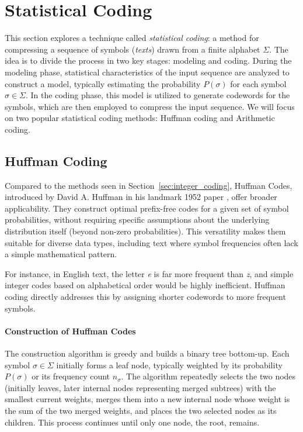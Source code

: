\clearpage
\section{Statistical Coding} \label{sec:statistical_coding}

This section explores a technique called \emph{statistical coding}: a method for compressing a sequence of symbols (\emph{texts}) drawn from a finite alphabet $\Sigma$. The idea is to divide the process in two key stages: modeling and coding. During the modeling phase, statistical characteristics of the input sequence are analyzed to construct a model, typically estimating the probability $P(\sigma)$ for each symbol $\sigma \in \Sigma$. In the coding phase, this model is utilized to generate codewords for the symbols, which are then employed to compress the input sequence. We will focus on two popular statistical coding methods: Huffman coding and Arithmetic coding.

\subsection{Huffman Coding} \label{subsec:huffman_coding}

Compared to the methods seen in Section~\ref{sec:integer_coding}, Huffman Codes, introduced by David A. Huffman in his landmark 1952 paper \cite{Huffman1952}, offer broader applicability. They construct optimal prefix-free codes for a given set of symbol probabilities, without requiring specific assumptions about the underlying distribution itself (beyond non-zero probabilities). This versatility makes them suitable for diverse data types, including text where symbol frequencies often lack a simple mathematical pattern.

For instance, in English text, the letter \emph{e} is far more frequent than \emph{z}, and simple integer codes based on alphabetical order would be highly inefficient. Huffman coding directly addresses this by assigning shorter codewords to more frequent symbols.


\paragraph{Construction of Huffman Codes} The construction algorithm is greedy and builds a binary tree bottom-up. Each symbol $\sigma \in \Sigma$ initially forms a leaf node, typically weighted by its probability $P(\sigma)$ or its frequency count $n_\sigma$. The algorithm repeatedly selects the two nodes (initially leaves, later internal nodes representing merged subtrees) with the smallest current weights, merges them into a new internal node whose weight is the sum of the two merged weights, and places the two selected nodes as its children. This process continues until only one node, the root, remains.

